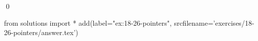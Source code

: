 
\begin{ex}
  \label{ex:18-26-pointers}
  
  \qed
\end{ex}
\begin{python0}
from solutions import *
add(label="ex:18-26-pointers",
    srcfilename='exercises/18-26-pointers/answer.tex')
\end{python0}

